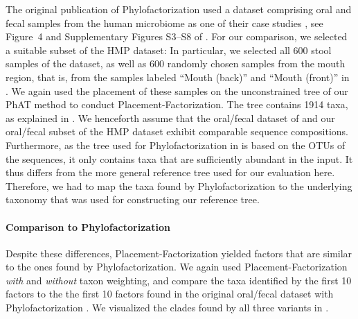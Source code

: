 The original publication of Phylofactorization used a dataset comprising oral and fecal samples from the human microbiome
as one of their case studies \cite{Caporaso2011}, see Figure~4 and Supplementary Figures S3--S8 of .
For our comparison, we selected a suitable subset of the \ac{HMP} dataset: %
In particular, we selected all \num{600} stool samples of the dataset,
as well as \num{600} randomly chosen samples from the mouth region,
that is, from the samples labeled ``Mouth (back)'' and ``Mouth (front)'' in .
We again used the placement of these samples on the unconstrained  tree
of our \acf{PhAT} method to conduct Placement-Factorization.
The tree contains \num{1 914} taxa, as explained in .
We henceforth assume that the oral/fecal dataset of 
and our oral/fecal subset of the \ac{HMP} dataset exhibit comparable sequence compositions.
Furthermore, as the tree used for Phylofactorization in  is based on the OTUs of the sequences,
it only contains taxa that are sufficiently abundant in the input.
It thus differs from the more general  reference tree used for our evaluation here.
Therefore, we had to map the taxa found by Phylofactorization
to the underlying  taxonomy \cite{Quast2013,Yilmaz2014} that was used for constructing our reference tree.


\paragraph{Comparison to Phylofactorization}
\label{ch:Factorization:sec:Evaluation:sub:OralFecalHMPDataset:par:Comparison}

Despite these differences, Placement-Factorization yielded factors that are similar to the ones found by Phylofactorization.
We again used Placement-Factorization \emph{with} and \emph{without} taxon weighting,
and compare the taxa identified by the first \num{10} factors
to the the first \num{10} factors found in the original oral/fecal dataset with Phylofactorization \cite{Washburne2017a}.
We visualized the clades found by all three variants in .

